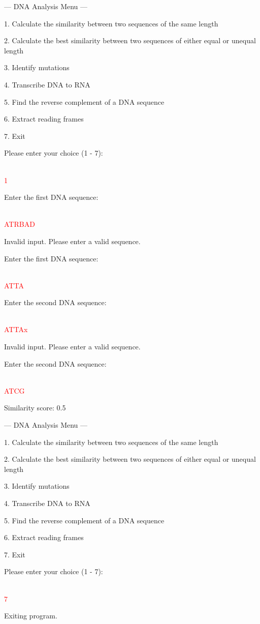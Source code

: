 \begin{sample}

    --- DNA Analysis Menu ---
    
    1. Calculate the similarity between two sequences of the same length
    
    2. Calculate the best similarity between two sequences of either equal or unequal length
    
    3. Identify mutations
    
    4. Transcribe DNA to RNA
    
    5. Find the reverse complement of a DNA sequence
    
    6. Extract reading frames
    
    7. Exit
    
    Please enter your choice (1 - 7): 
    
    \\\textcolor{red}{1}

    Enter the first DNA sequence: 

    \\\textcolor{red}{ATRBAD}

    Invalid input. Please enter a valid sequence.

    Enter the first DNA sequence: 

    \\\textcolor{red}{ATTA}
    
    Enter the second DNA sequence: 

    \\\textcolor{red}{ATTAx}

    Invalid input. Please enter a valid sequence.

    Enter the second DNA sequence: 
    
    \\\textcolor{red}{ATCG}

    Similarity score: 0.5

    --- DNA Analysis Menu ---
    
    1. Calculate the similarity between two sequences of the same length
   
    2. Calculate the best similarity between two sequences of either equal or unequal length
    
    3. Identify mutations
    
    4. Transcribe DNA to RNA
    
    5. Find the reverse complement of a DNA sequence
    
    6. Extract reading frames
    
    7. Exit
    
    Please enter your choice (1 - 7): 
    
    \\\textcolor{red}{7}
    
    Exiting program.
\end{sample}